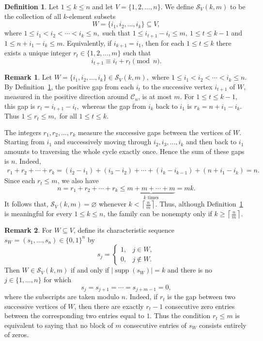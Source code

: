 \documentclass[12pt,reqno]{amsart}
\theoremstyle{definition}
\newtheorem{definition}{Definition}
\newtheorem{remark}{Remark}
\numberwithin{equation}{section}
\def\C{\mathcal{C}}
\begin{document}
\begin{definition}\label{def:SV}
	Let $1\leq k\leq n$ and let \( V=\{1,2,\ldots,n\}. \)
	We define $\mathcal{S}_V(k,m)$ to be the collection of all $k$-element
	subsets
	\[
	W=\{i_1,i_2,\ldots,i_k\}\subseteq V,
	\]
	where \( 1\leq i_1<i_2<\cdots<i_k\leq n, \) such that \( 1\leq i_{t+1}-i_t\leq m,~ 1\leq t\leq k-1 \)
	and \( 1\leq n+i_1-i_k\leq m. \)
	Equivalently, if $i_{k+1}=i_1$, then for each
	$1\leq t\leq k$ there exists a unique integer
	$r_t\in\{1,2,\ldots,m\}$ such that
	\[
	i_{t+1}\equiv i_t+r_t\pmod n.
	\]
\end{definition}

\begin{remark}\label{rem:gaps}
Let \( W=\{i_1,i_2,\ldots,i_k\}\in\mathcal{S}_V(k,m), \) where \( 1\leq i_1<i_2<\cdots<i_k\leq n. \) By Definition~\ref{def:SV}, the positive gap from each $i_t$ to the
successive vertex $i_{t+1}$ of $W$, measured in the positive direction
around $\C_n$, is at most $m$. For $1\leq t\leq k-1$, this gap is \( r_t=i_{t+1}-i_t, \)
whereas the gap from $i_k$ back to $i_1$ is \( r_k=n+i_1-i_k. \)
Thus \( 1\leq r_t\leq m, \)
for all \( 1\leq t\leq k. \)	

	The integers $r_1,r_2,\ldots,r_k$ measure the successive gaps between the
	vertices of $W$. Starting from $i_1$ and successively moving through
	$i_2,i_3,\ldots,i_k$ and then back to $i_1$ amounts to traversing the
	whole cycle exactly once. Hence the sum of these gaps is $n$. Indeed,
	\[
	\begin{aligned}
		r_1+r_2+\cdots+r_k
		=(i_2-i_1)+(i_3-i_2)+\cdots+(i_k-i_{k-1})
		+(n+i_1-i_k)
		=n.
	\end{aligned}
	\]
	Since each $r_t\leq m$, we also have
	\[
	n=r_1+r_2+\cdots+r_k\leq
	\underbrace{m+m+\cdots+m}_{k\text{ times}}=mk.
	\]
It follows that, \( \mathcal{S}_V(k,m)=\varnothing \) whenever \( k<\left\lceil\frac{n}{m}\right\rceil. \)
Thus, although Definition~\ref{def:SV} is meaningful for every
$1\leq k\leq n$, the family can be nonempty only if
\( k\geq\left\lceil\frac{n}{m}\right\rceil. \)
\end{remark}

\begin{remark}\label{rem:binary}
For $W\subseteq V$, define its characteristic sequence
$s_W=(s_1,\ldots,s_n)\in\{0,1\}^n$ by
\[
s_j=
\begin{cases}
1,&j\in W,\\
0,&j\notin W.
\end{cases}
\]
Then $W\in\mathcal{S}_V(k,m)$ if and only if $|\operatorname{supp}(s_W)|=k$
and there is no $j\in\{1,\ldots,n\}$ for which
\[
s_j=s_{j+1}=\cdots=s_{j+m-1}=0,
\]
where the subscripts are taken modulo $n$. Indeed, if $r_t$ is the gap between two successive vertices of $W$, then
there are exactly $r_t-1$ consecutive zero entries between the
corresponding two entries equal to $1$. Thus the condition $r_t\leq m$
is equivalent to saying that no block of $m$ consecutive entries of
$s_W$ consists entirely of zeros.
\end{remark}
\end{document}
